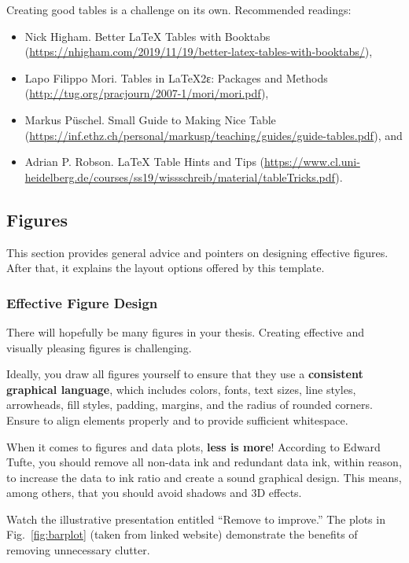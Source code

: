 Creating good tables is a challenge on its own. Recommended readings: 
\begin{itemize}
\item Nick Higham. Better LaTeX Tables with Booktabs (\url{https://nhigham.com/2019/11/19/better-latex-tables-with-booktabs/}),
\item Lapo Filippo Mori. Tables in \LaTeX{}2ε: Packages and Methods (\url{http://tug.org/pracjourn/2007-1/mori/mori.pdf}),
\item Markus Püschel. Small Guide to Making Nice Table (\url{https://inf.ethz.ch/personal/markusp/teaching/guides/guide-tables.pdf}), and
\item Adrian P. Robson. \LaTeX{} Table Hints and Tips (\url{https://www.cl.uni-heidelberg.de/courses/ss19/wissschreib/material/tableTricks.pdf}).
\end{itemize}

\subsection{Figures}

This section provides general advice and pointers on designing effective figures. After that, it explains the layout options offered by this template.

\subsubsection{Effective Figure Design}

There will hopefully be many figures in your thesis. Creating effective and visually pleasing figures is challenging.

Ideally, you draw all figures yourself to ensure that they use a \textbf{consistent graphical language}, which includes colors, fonts, text sizes, line styles, arrowheads, fill styles, padding, margins, and the radius of rounded corners. Ensure to align elements properly and to provide sufficient whitespace.

When it comes to figures and data plots, \textbf{less is more}! According to Edward Tufte,%
you should remove all non-data ink and redundant data ink, within reason, to increase the data to ink ratio and create a sound graphical design. This means, among others, that you should avoid shadows and 3D effects.

Watch the illustrative presentation entitled ``Remove to improve.'' The plots in Fig.~\ref{fig:barplot} (taken from linked website) demonstrate the benefits of removing unnecessary clutter.


